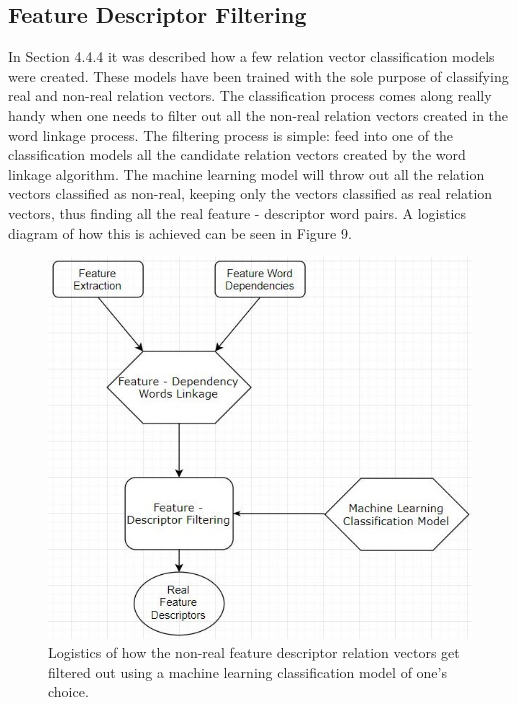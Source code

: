 \documentclass{sig-alternate}
\begin{document}
\subsection{Feature Descriptor Filtering}
In Section 4.4.4 it was described how a few relation vector classification models were created. These models have been trained with the sole purpose of classifying real and non-real relation vectors. The classification process comes along really handy when one needs to filter out all the non-real relation vectors created in the word linkage process. The filtering process is simple: feed into one of the classification models all the candidate relation vectors created by the word linkage algorithm. The machine learning model will throw out all the relation vectors classified as non-real, keeping only the vectors classified as real relation vectors, thus finding all the real feature - descriptor word pairs. A logistics diagram of how this is achieved can be seen in Figure 9. 

\begin{figure}
\centering
\includegraphics[scale=0.60]{images/opinion_filtering.JPG}
\caption{Logistics of how the non-real feature descriptor relation vectors get filtered out using a machine learning classification model of one's choice.}
\end{figure}
\end{document}
